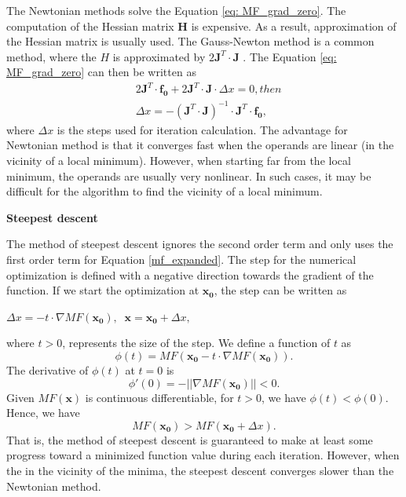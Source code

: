 The Newtonian methods solve the Equation \ref{eq: MF_grad_zero}. The computation of the Hessian matrix $\pmb{H}$ is expensive. As a result, approximation of the Hessian matrix is usually used. The Gauss-Newton method is a common method, where the $H$ is approximated by $2\pmb{J}^T \cdot \pmb{J}$ . The Equation \ref{eq: MF_grad_zero} can then be written as 
\begin{equation} \label{eq: gauss-newton}
\begin{split}
&2 \pmb{J}^{T} \cdot \pmb{f_0} + 2\pmb{J}^T \cdot \pmb{J} \cdot \Delta x = 0 ,  then\\
&\Delta x = - (\pmb{J}^T \cdot \pmb{J} )^{-1} \cdot \pmb{J}^{T} \cdot \pmb{f_0},
\end{split}
\end{equation}
where $\Delta x$ is the steps used for iteration calculation. 
The advantage for Newtonian method is that it converges fast when the operands are linear (in the vicinity of a local minimum). However, when starting far from the local minimum, the operands are usually very nonlinear. In such cases, it may be difficult for the algorithm to find the vicinity of a local minimum. 
\newline

\textbf{Steepest descent}

The method of steepest descent  ignores the second order term and only uses the first order term for  Equation \ref{mf_expanded}. The step for the numerical optimization is defined with a negative direction towards the gradient of the function. If we start the optimization at $\pmb{x_0}$, the step can be written as
\medskip
\newline
\begin{center}
$
\Delta x = - t \cdot \nabla MF(\pmb{x_0}), \;\; \pmb{x} = \pmb{x_0} + \Delta x,
$
\end{center}
\medskip
where $t>0$, represents the size of the step. We define a function of $t$ as 
\begin{equation} \label{eq: function of t}
\phi(t) = MF(\pmb{x_0} - t \cdot \nabla MF(\pmb{x_0})).
\end{equation}The derivative of $\phi(t)$ at $t=0$ is
\begin{equation}\label{t=0}
\phi'(0) = - \vert\vert \nabla MF(\pmb{x_0}) \vert \vert < 0.
\end{equation}Given $MF(\pmb{x})$ is continuous differentiable, for $t>0$, we have $\phi(t) < \phi(0)$. Hence, we have
\begin{equation}
MF(\pmb{x_0}) > MF(\pmb{x_0} + \Delta x).
\end{equation}That is, the method of steepest descent is guaranteed to make at least some progress toward a minimized function value during each iteration. However, when the in the vicinity of the minima, the steepest descent converges slower than the Newtonian method.
\newline

